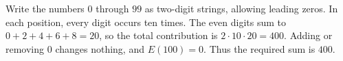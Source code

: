 Write the numbers $0$ through $99$ as two-digit strings, allowing leading zeros. In each position, every digit occurs ten times. The even digits sum to $0+2+4+6+8=20$, so the total contribution is $2\cdot10\cdot20=400$. Adding or removing $0$ changes nothing, and $E(100)=0$. Thus the required sum is $\boxed{400}$.
